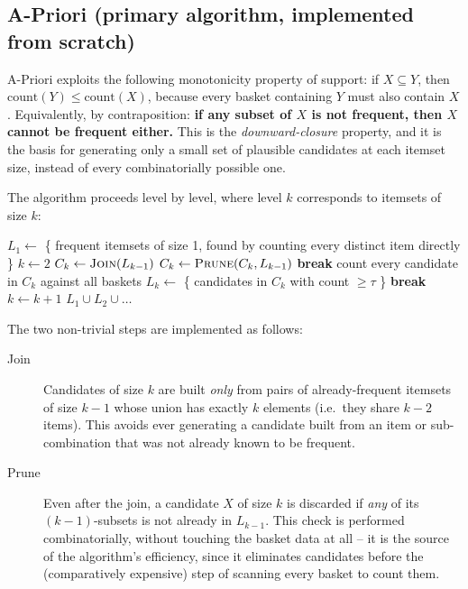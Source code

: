 \documentclass[11pt,a4paper]{article}
\begin{document}
\subsection{A-Priori (primary algorithm, implemented from scratch)}

A-Priori exploits the following monotonicity property of support: if
$X \subseteq Y$, then $\text{count}(Y) \le \text{count}(X)$, because every
basket containing $Y$ must also contain $X$. Equivalently, by contraposition:
\textbf{if any subset of $X$ is not frequent, then $X$ cannot be frequent
either.} This is the \emph{downward-closure} property, and it is the basis for
generating only a small set of plausible candidates at each itemset size,
instead of every combinatorially possible one.

The algorithm proceeds level by level, where level $k$ corresponds to itemsets
of size $k$:

\begin{algorithm}[h]
\caption{A-Priori (as implemented)}
\begin{algorithmic}[1]
\State $L_1 \gets$ \{ frequent itemsets of size 1, found by counting every
distinct item directly \}
\State $k \gets 2$
    \State $C_k \gets \textsc{Join}(L_{k-1})$ 
    \State $C_k \gets \textsc{Prune}(C_k, L_{k-1})$ 
        \State \textbf{break}
    \EndIf
    \State count every candidate in $C_k$ against all baskets
    \State $L_k \gets$ \{ candidates in $C_k$ with count $\ge \tau$ \}
        \State \textbf{break}
    \EndIf
    \State $k \gets k + 1$
\EndWhile
\State \Return $L_1 \cup L_2 \cup \dots$
\end{algorithmic}
\end{algorithm}

The two non-trivial steps are implemented as follows:

\begin{description}
    \item[Join] Candidates of size $k$ are built \emph{only} from pairs of
    already-frequent itemsets of size $k-1$ whose union has exactly $k$
    elements (i.e.\ they share $k-2$ items). This avoids ever generating a
    candidate built from an item or sub-combination that was not already known
    to be frequent.
    \item[Prune] Even after the join, a candidate $X$ of size $k$ is discarded
    if \emph{any} of its $(k-1)$-subsets is not already in $L_{k-1}$. This
    check is performed combinatorially, without touching the basket data at
    all -- it is the source of the algorithm's efficiency, since it eliminates
    candidates before the (comparatively expensive) step of scanning every
    basket to count them.
\end{description}
\end{document}
